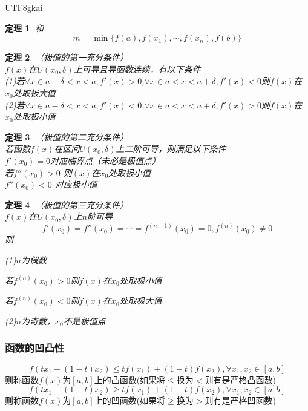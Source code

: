 \documentclass{article}
\newtheorem{theorem}{定理}[subsection]
\newenvironment{identification}{%
\heiti{定义}\kaishu
}{%
}
\begin{document}
\begin{CJK}{UTF8}{gkai}
\begin{theorem}
  和
  \[m = \min\{f(a),f(x_1),\cdots,f(x_n),f(b)\}\]
\end{theorem}

\begin{theorem}（极值的第一充分条件）\\
$f(x)$在$U(x_0,\delta)$上可导且导函数连续，有以下条件\\
(1)若$\forall x\in a-\delta<x<a,f'(x) > 0$,$\forall x\in a<x<a + \delta,f'(x) < 0$则$f(x)$在$x_0$处取极大值\\
(2)若$\forall x\in a-\delta<x<a,f'(x) < 0$,$\forall x\in a<x<a + \delta,f'(x) > 0$则$f(x)$在$x_0$处取极小值\\
\end{theorem}

\begin{theorem}（极值的第二充分条件）\\
若函数$f(x)$在区间$U(x_0,\delta)$上二阶可导，则满足以下条件\\
$f'(x_0) = 0$对应临界点（未必是极值点）\\
若$f''(x_0) > 0$ 则$(x)$在$x_0$处取极小值\\
$f''(x_0) < 0$ 对应极小值\\
\end{theorem}

\begin{theorem}（极值的第三充分条件）\\

$f(x)$在$U(x_0,\delta)$上$n$阶可导
\[f'(x_0) = f''(x_0) = \cdots =f^{(n-1)}(x_0) = 0,f^{(n)}(x_0)\neq 0\]
则

(1)$n$为偶数

若$f^{(n)}(x_0) > 0$则$f(x)$在$x_0$处取极小值

若$f^{(n)}(x_0) < 0$则$f(x)$在$x_0$处取极大值

(2)$n$为奇数，$x_0$不是极值点
\end{theorem}

\subsubsection{函数的凹凸性}

\begin{identification}
\[f(tx_1 + (1-t)x_2)  \leq tf(x_1) + (1-t) f(x_2),\forall x_1 ,x_2 \in [a,b]\]
则称函数$f(x)$为$[a,b]$上的凸函数(如果将$\leq$换为$<$则有是严格凸函数)\\

\[f(tx_1 + (1-t)x_2)  \geq tf(x_1) + (1-t) f(x_2),\forall x_1 ,x_2 \in [a,b]\]
则称函数$f(x)$为$[a,b]$上的凹函数(如果将$\geq$换为$>$则有是严格凹函数)\\
\end{identification}


\end{CJK}
\end{document}
